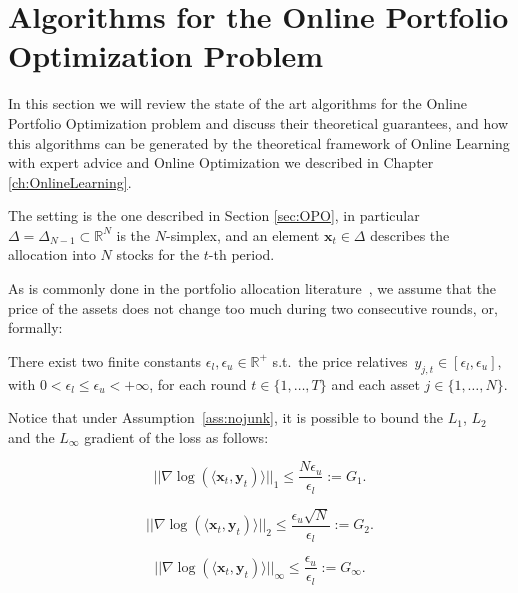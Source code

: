 \chapter{Algorithms for the Online Portfolio Optimization Problem}\label{ch:algos}

In this section we will review the state of the art algorithms for the Online Portfolio Optimization problem and discuss their theoretical guarantees, and how this algorithms can be generated by the theoretical framework of Online Learning with expert advice and Online Optimization we described in Chapter \ref{ch:OnlineLearning}.

The setting is the one described in Section \ref{sec:OPO}, in particular $\Delta=\Delta_{N-1}\subset \mathbb R^N$ is the $N$-simplex, and an element $\mathbf x_t\in\Delta$ describes the allocation into $N$ stocks for the $t$-th period.

As is commonly done in the portfolio allocation literature~\cite{agarwal2006algorithms}, we assume that the price of the assets does not change too much during two consecutive rounds, or, formally:

\begin{assumption} \label{ass:nojunk}
     There exist two finite constants $\epsilon_l, \epsilon_u \in \mathbb{R}^+$ s.t.~the price relatives~$y_{j,t} \in [\epsilon_l, \epsilon_u]$, with $0 < \epsilon_l \leq \epsilon_u < +\infty$, for each round $t \in \{ 1, \ldots, T \}$ and each asset $j \in \{1, \ldots, N \}$.
\end{assumption}

Notice that under Assumption~\ref{ass:nojunk}, it is possible to bound the $L_1$, $L_2$ and the $L_\infty$ gradient of the loss as follows:

\begin{equation} \label{eq:bounded_gradient}
    ||\nabla \log (\langle \mathbf{x}_t, \mathbf{y}_t) \rangle||_1 \leq \frac{N\epsilon_u}{\epsilon_l}:=G_1.
\end{equation}

\begin{equation} \label{eq:bounded_gradient}
    ||\nabla \log (\langle \mathbf{x}_t, \mathbf{y}_t) \rangle||_2 \leq \frac{\epsilon_u \sqrt{N}}{\epsilon_l}:=G_2.
\end{equation}

\begin{equation} \label{eq:bounded_gradient}
    ||\nabla \log (\langle \mathbf{x}_t, \mathbf{y}_t) \rangle||_\infty \leq \frac{\epsilon_u }{\epsilon_l}:=G_\infty.
\end{equation}

